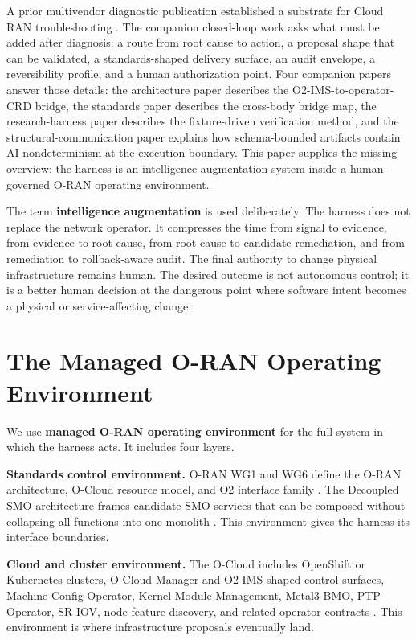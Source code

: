 \documentclass[twocolumn,10pt,a4paper]{article}
\begin{document}
A prior multivendor diagnostic publication established a substrate for Cloud RAN troubleshooting \cite{multivendor_blog_2026}. The companion closed-loop work asks what must be added after diagnosis: a route from root cause to action, a proposal shape that can be validated, a standards-shaped delivery surface, an audit envelope, a reversibility profile, and a human authorization point. Four companion papers answer those details: the architecture paper describes the O2-IMS-to-operator-CRD bridge, the standards paper describes the cross-body bridge map, the research-harness paper describes the fixture-driven verification method, and the structural-communication paper explains how schema-bounded artifacts contain AI nondeterminism at the execution boundary. This paper supplies the missing overview: the harness is an intelligence-augmentation system inside a human-governed O-RAN operating environment.

The term \textbf{intelligence augmentation} is used deliberately. The harness does not replace the network operator. It compresses the time from signal to evidence, from evidence to root cause, from root cause to candidate remediation, and from remediation to rollback-aware audit. The final authority to change physical infrastructure remains human. The desired outcome is not autonomous control; it is a better human decision at the dangerous point where software intent becomes a physical or service-affecting change.

\section{The Managed O-RAN Operating Environment}
\label{sec:environment}

We use \textbf{managed O-RAN operating environment} for the full system in which the harness acts. It includes four layers.

\textbf{Standards control environment.} O-RAN WG1 and WG6 define the O-RAN architecture, O-Cloud resource model, and O2 interface family \cite{oran_wg1_arch,oran_o2_ganp,oran_o2_ims}. The Decoupled SMO architecture frames candidate SMO services that can be composed without collapsing all functions into one monolith \cite{oran_decoupled_smo}. This environment gives the harness its interface boundaries.

\textbf{Cloud and cluster environment.} The O-Cloud includes OpenShift or Kubernetes clusters, O-Cloud Manager and O2 IMS shaped control surfaces, Machine Config Operator, Kernel Module Management, Metal3 BMO, PTP Operator, SR-IOV, node feature discovery, and related operator contracts \cite{oran_o2ims_ocm,openshift_mco,kmm_operator,metal3_bmo,redhat_ptp_operator}. This environment is where infrastructure proposals eventually land.
\end{document}
